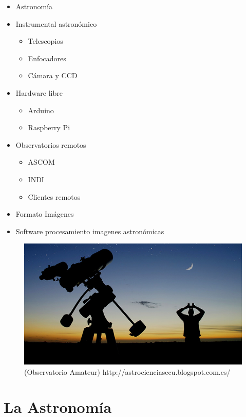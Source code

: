 \begin{itemize}
  \item {Astronomía}
  
  \item {Instrumental astronómico}
  \begin{itemize}	
    \item{Telescopios}
    \item{Enfocadores}
    \item{Cámara y CCD}
    
      
  \end{itemize}
  
  \item {Hardware libre}
   \begin{itemize}
     \item{Arduino}
     \item{Raspberry Pi}
   \end{itemize}
   
  \item {Observatorios remotos}
   \begin{itemize}
     \item{ASCOM}
     \item{INDI}
     \item{Clientes remotos}
  \end{itemize}
  
  \item{Formato Imágenes}
  \item {Software procesamiento imagenes astronómicas}

\end{itemize}


\begin{figure}[h]
\centering
\includegraphics[width=0.7\linewidth]{../images/observatorio_amateur}
\caption[Observatorio Amateur]{(Observatorio Amateur) http://astrocienciasecu.blogspot.com.es/}
\label{fig:observatorio_amateur}
\end{figure}
\newpage

\section{La Astronomía}

